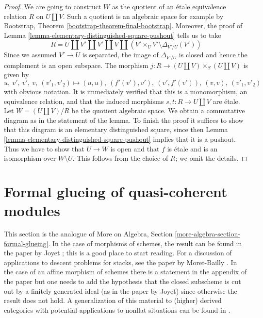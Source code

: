 \documentclass{stacks-project}
\theoremstyle{plain}
\theoremstyle{definition}
\theoremstyle{remark}
\numberwithin{equation}{subsection}
\begin{document}
\begin{proof}
We are going to construct $W$ as the quotient of an \'etale
equivalence relation $R$ on $U \amalg V$. Such a quotient is an
algebraic space for example by
Bootstrap, Theorem \ref{bootstrap-theorem-final-bootstrap}.
Moreover, the proof of
Lemma \ref{lemma-elementary-distinguished-square-pushout} tells us to take
$$
R = U \amalg V' \amalg V' \amalg V \amalg
(V' \times_U V' \setminus \Delta_{V'/U}(V'))
$$
Since we assumed $V' \to U$ is separated, the image of
$\Delta_{V'/U}$ is closed and hence the complement is an
open subspace. The morphism $j : R \to (U \amalg V) \times_S (U \amalg V)$
is given by
$$
u,\ v',\ v',\ v,\ (v'_1, v'_2) \mapsto
(u, u),\ (f'(v'), v'),\ (v', f'(v')),\ (v, v),\ (v'_1, v'_2)
$$
with obvious notation. It is immediately verified that this is a
monomorphism, an equivalence relation, and that the induced morphisms
$s, t : R \to U \amalg V$ are \'etale. Let
$W = (U \amalg V)/R$ be the quotient algebraic space.
We obtain a commutative diagram as in the statement of the lemma.
To finish the proof it suffices to show that this diagram is
an elementary distinguished square, since then
Lemma \ref{lemma-elementary-distinguished-square-pushout}
implies that it is a pushout.
Thus we have to show that $U \to W$ is open and that
$f$ is \'etale and is an isomorphism over $W \setminus U$.
This follows from the choice of $R$; we omit the details.
\end{proof}






\section{Formal glueing of quasi-coherent modules}
\label{section-formal-glueing}

\noindent
This section is the analogue of
More on Algebra, Section \ref{more-algebra-section-formal-glueing}.
In the case of morphisms of schemes, the result can be found in
the paper by Joyet \cite{Joyet}; this is a good place to start reading.
For a discussion of applications to descent problems for stacks, see the
paper by Moret-Bailly \cite{MB}. In the case of an affine
morphism of schemes there is a statement in the appendix of the paper
\cite{Ferrand-Raynaud} but one needs to add the hypothesis
that the closed subscheme is cut out by a finitely generated
ideal (as in the paper by Joyet) since otherwise the result does not hold.
A generalization of this material to (higher) derived categories
with potential applications to nonflat situations
can be found in \cite[Section 5]{Bhatt-Algebraize}.
\end{document}
